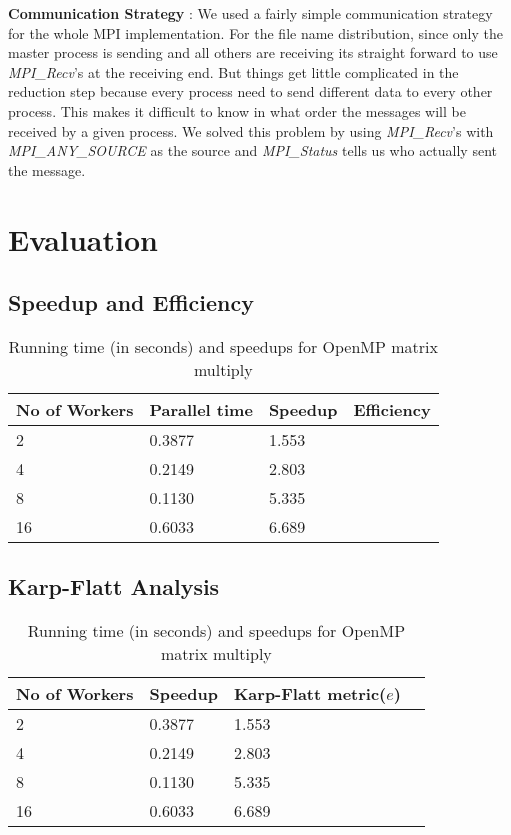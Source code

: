 \documentclass[12pt]{article}
\begin{document}
\noindent \textbf{Communication Strategy} : We used a fairly simple communication strategy for the whole MPI implementation. For the file name distribution, since only the master process is sending and all others are 
receiving its straight forward to use {\em MPI\_Recv}'s at the receiving end. But things get little complicated in the reduction step because every process need to send different data to every other process. This makes 
it difficult to know in what order the messages will be received by a given process. We solved this problem by using {\em MPI\_Recv}'s with {\em MPI\_ANY\_SOURCE} as the source and {\em MPI\_Status} tells us who actually sent 
the message.
\section{Evaluation}
\subsection{Speedup and Efficiency}
\begin{table*}[ht]
\centering
\begin{tabular}{|l|l|l|l|}
\hline
 No of Workers & Parallel time  & Speedup & Efficiency\\ \hline
 2  & 0.3877    & 1.553  & \\ \hline
 4  & 0.2149    & 2.803  & \\ \hline
 8  & 0.1130    & 5.335  &\\ \hline
 16 & 0.6033    & 6.689  & \\ \hline
\end{tabular}
\caption{Running time (in seconds) and speedups for OpenMP matrix multiply}
\label{omp-table}
\end{table*}

\subsection{Karp-Flatt Analysis}
\begin{table*}[ht]
\centering
\begin{tabular}{|l|l|l|l|}
\hline
 No of Workers & Speedup  & Karp-Flatt metric($e$) \\ \hline
 2  & 0.3877    & 1.553   \\ \hline
 4  & 0.2149    & 2.803   \\ \hline
 8  & 0.1130    & 5.335  \\ \hline
 16 & 0.6033    & 6.689   \\ \hline
\end{tabular}
\caption{Running time (in seconds) and speedups for OpenMP matrix multiply}
\label{omp-table}
\end{table*}
\end{document}
